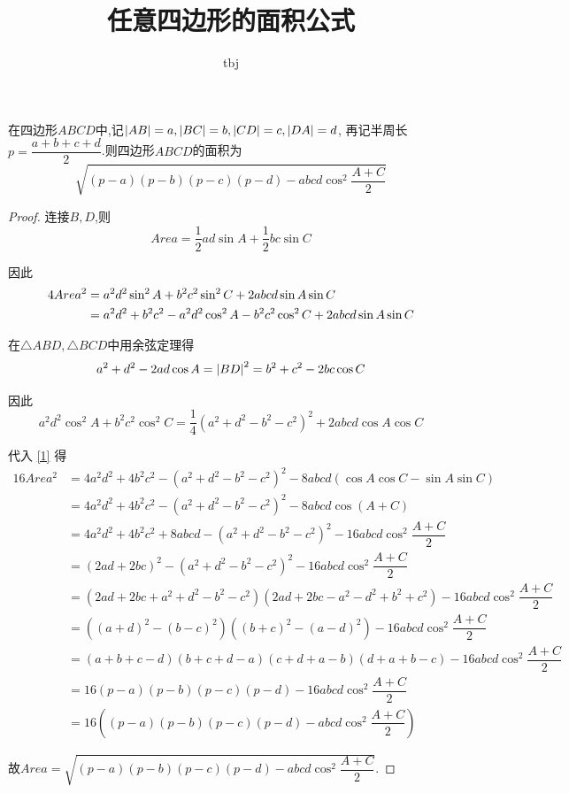 \documentclass{article}
\title{任意四边形的面积公式}
\author{tbj}
\date{}
\begin{document}
\maketitle

\begin{thm}
    在四边形$ABCD$中,记$\left\lvert AB \right\rvert = a, \left\lvert BC \right\rvert = b, \left\lvert CD \right\rvert = c, \left\lvert DA \right\rvert = d$,
    再记半周长$p = \dfrac{a + b + c + d}{2}$.则四边形$ABCD$的面积为
    \[ \sqrt{(p - a)(p - b)(p - c)(p - d) - abcd \cos^2 \dfrac{A + C}{2}} \]
\end{thm}

\begin{proof}
    连接$B, D$,则
    \[Area = \dfrac{1}{2} ad \sin A + \dfrac{1}{2} bc \sin C\]

    因此
    \begin{align}
        4Area^2 & = a^2d^2 \sin^2 A + b^2c^2 \sin^2 C + 2abcd \sin A \sin C \notag \\
        & = a^2d^2 + b^2c^2 -a^2d^2 \cos^2 A - b^2c^2 \cos^2 C + 2abcd \sin A \sin C \label{1}
    \end{align}

    在$\triangle ABD, \triangle BCD$中用余弦定理得
    \[ a^2 + d^2 - 2ad \cos A = \left\lvert BD \right\rvert^2 = b^2 + c^2 - 2bc \cos C \]

    因此
    \[ a^2d^2 \cos^2 A + b^2c^2 \cos^2 C = \dfrac{1}{4} (a^2 + d^2 - b^2 - c^2)^2 + 2abcd \cos A \cos C \]

    代入 \eqref{1} 得
    \begin{align*}
        16Area^2 & = 4a^2d^2 + 4b^2c^2 - \left( a^2 + d^2 - b^2 - c^2 \right)^2 - 8abcd(\cos A \cos C - \sin A \sin C) \\
        & = 4a^2d^2 + 4b^2c^2 - \left( a^2 + d^2 - b^2 - c^2 \right)^2 - 8abcd \cos (A + C) \\
        & = 4a^2d^2 + 4b^2c^2 + 8abcd - \left( a^2 + d^2 - b^2 - c^2 \right)^2 - 16abcd \cos^2 \dfrac{A + C}{2} \\
        & = \left( 2ad + 2bc \right)^2 - \left( a^2 + d^2 - b^2 - c^2 \right)^2 - 16abcd \cos^2 \dfrac{A + C}{2} \\
        & = \left( 2ad + 2bc + a^2 + d^2 - b^2 - c^2 \right) \left( 2ad + 2bc - a^2 - d^2 + b^2 + c^2 \right) - 16abcd \cos^2 \dfrac{A + C}{2} \\
        & = \left( (a + d)^2 - (b - c)^2 \right) \left( (b + c)^2 - (a - d)^2 \right) - 16abcd \cos^2 \dfrac{A + C}{2} \\
        & = (a + b + c - d)(b + c + d - a)(c + d + a - b)(d + a + b - c) - 16abcd \cos^2 \dfrac{A + C}{2} \\
        & = 16(p - a)(p - b)(p - c)(p - d) - 16abcd \cos^2 \dfrac{A + C}{2} \\
        & = 16 \left( (p - a)(p - b)(p - c)(p - d) - abcd \cos^2 \dfrac{A + C}{2} \right)
    \end{align*}

    故$Area = \sqrt{(p - a)(p - b)(p - c)(p - d) - abcd \cos^2 \dfrac{A + C}{2}}$.
\end{proof}
\end{document}
